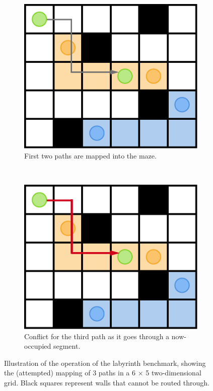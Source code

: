 \begin{figure}[b]
\begin{subfigure}[t]{.24\textwidth}
    \end{subfigure}%
    ~
    \begin{subfigure}[t]{.24\textwidth}
        \includegraphics[width=\textwidth,keepaspectratio]{gfx/preliminaries-labyrinth/4-maze_update2}
        \caption{First two paths are mapped into the maze.}%
    \end{subfigure}%
    ~
    \begin{subfigure}[t]{.24\textwidth}
        \includegraphics[width=\textwidth,keepaspectratio]{gfx/preliminaries-labyrinth/5-maze_update3}
        \caption{Conflict for the third path as it goes through a now-occupied segment.}%
        \label{fig:preliminary:labyrinth:unroutable}
    \end{subfigure}%
    \caption{Illustration of the operation of the labyrinth benchmark, showing the (attempted) mapping of 3 paths in a 6 $\times$ 5 two-dimensional grid. Black squares represent walls that cannot be routed through.}%
    \label{fig:preliminary:labyrinth}
\end{figure}

